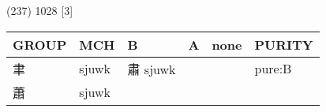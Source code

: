 \documentclass[14pt,a4paper]{scrartcl}
\begin{document}
(237) 1028 {[}3{]}

\begin{longtable}[c]{@{}llllll@{}}
\toprule
\begin{minipage}[b]{0.14\columnwidth}\raggedright\strut
GROUP
\strut\end{minipage} &
\begin{minipage}[b]{0.14\columnwidth}\raggedright\strut
MCH
\strut\end{minipage} &
\begin{minipage}[b]{0.14\columnwidth}\raggedright\strut
B
\strut\end{minipage} &
\begin{minipage}[b]{0.14\columnwidth}\raggedright\strut
A
\strut\end{minipage} &
\begin{minipage}[b]{0.14\columnwidth}\raggedright\strut
none
\strut\end{minipage} &
\begin{minipage}[b]{0.14\columnwidth}\raggedright\strut
PURITY
\strut\end{minipage}\tabularnewline
\midrule
\endhead
\begin{minipage}[t]{0.14\columnwidth}\raggedright\strut
聿
\strut\end{minipage} &
\begin{minipage}[t]{0.14\columnwidth}\raggedright\strut
sjuwk
\strut\end{minipage} &
\begin{minipage}[t]{0.14\columnwidth}\raggedright\strut
肅 sjuwk
\strut\end{minipage} &
\begin{minipage}[t]{0.14\columnwidth}\raggedright\strut
\strut\end{minipage} &
\begin{minipage}[t]{0.14\columnwidth}\raggedright\strut
\strut\end{minipage} &
\begin{minipage}[t]{0.14\columnwidth}\raggedright\strut
pure:B
\strut\end{minipage}\tabularnewline
\begin{minipage}[t]{0.14\columnwidth}\raggedright\strut
蕭
\strut\end{minipage} &
\begin{minipage}[t]{0.14\columnwidth}\raggedright\strut
sjuwk
\strut\end{minipage} &
\begin{minipage}[t]{0.14\columnwidth}\raggedright\strut
\strut\end{minipage} &

\end{longtable}
\end{document}
